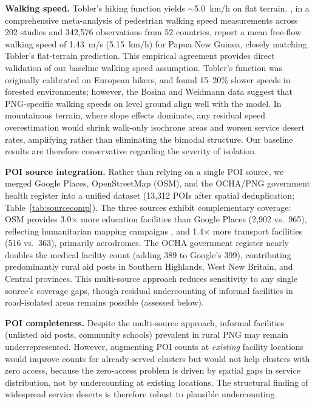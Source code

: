 \documentclass[review,3p,authoryear]{elsarticle}
\begin{document}
\textbf{Walking speed.} Tobler's hiking function yields $\sim$\SI{5.0}{\kilo\metre/\hour} on flat terrain. \citet{bosina2017}, in a comprehensive meta-analysis of pedestrian walking speed measurements across 202 studies and 342,576 observations from 52 countries, report a mean free-flow walking speed of \SI{1.43}{\metre/\second} (\SI{5.15}{\kilo\metre/\hour}) for Papua New Guinea, closely matching Tobler's flat-terrain prediction. This empirical agreement provides direct validation of our baseline walking speed assumption. Tobler's function was originally calibrated on European hikers, and \citet{irmischer2018} found 15--20\% slower speeds in forested environments; however, the Bosina and Weidmann data suggest that PNG-specific walking speeds on level ground align well with the model. In mountainous terrain, where slope effects dominate, any residual speed overestimation would shrink walk-only isochrone areas and worsen service desert rates, amplifying rather than eliminating the bimodal structure. Our baseline results are therefore conservative regarding the severity of isolation.

\textbf{POI source integration.} Rather than relying on a single POI source, we merged Google Places, OpenStreetMap (OSM), and the OCHA/PNG government health register into a unified dataset (13,312 POIs after spatial deduplication; Table~\ref{tab:sourcecomp}). The three sources exhibit complementary coverage: OSM provides 3.0$\times$ more education facilities than Google Places (2,902 vs.\ 965), reflecting humanitarian mapping campaigns \citep{barrington2017}, and 1.4$\times$ more transport facilities (516 vs.\ 363), primarily aerodromes. The OCHA government register nearly doubles the medical facility count (adding 389 to Google's 399), contributing predominantly rural aid posts in Southern Highlands, West New Britain, and Central provinces. This multi-source approach reduces sensitivity to any single source's coverage gaps, though residual undercounting of informal facilities in road-isolated areas remains possible (assessed below).

\textbf{POI completeness.} Despite the multi-source approach, informal facilities (unlisted aid posts, community schools) prevalent in rural PNG may remain underrepresented. However, augmenting POI counts at \textit{existing} facility locations would improve counts for already-served clusters but would not help clusters with zero access, because the zero-access problem is driven by spatial gaps in service distribution, not by undercounting at existing locations. The structural finding of widespread service deserts is therefore robust to plausible undercounting.
\end{document}
